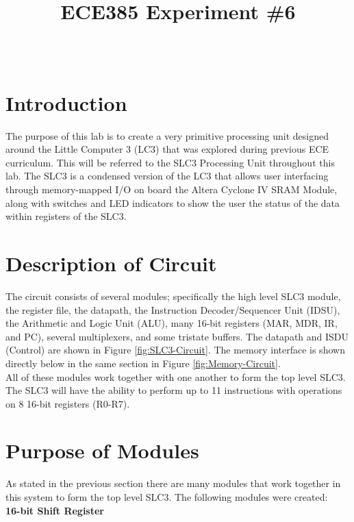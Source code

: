 \documentclass[journal, twocolumn, final,11pt,letterpaper]{IEEEtran}
\title{ECE385 Experiment \#6
	}
\author{
\IEEEauthorblockN{Eric Meyers, Ryan Helsdingen}\\
\IEEEauthorblockA{Section ABG; TAs: Ben Delay, Shuo Liu \\
March 9th, 2016 \\
emeyer7, helsdin2}}
\begin{document}
	
\maketitle
\singlespacing

\section{Introduction}
The purpose of this lab is to create a very primitive processing unit designed around the Little Computer 3 (LC3) that was explored during previous ECE curriculum. This will be referred to the SLC3 Processing Unit throughout this lab. The SLC3 is a condensed version of the LC3 that allows user interfacing through memory-mapped I/O on board the Altera Cyclone IV SRAM Module, along with switches and LED indicators to show the user the status of the data within registers of the SLC3.  

\section{Description of Circuit}
The circuit consists of several modules; specifically the high level SLC­3 module, the register file, the datapath, the Instruction Decoder/Sequencer Unit (IDSU), the Arithmetic and Logic Unit (ALU), many 16-bit registers (MAR, MDR, IR, and PC), several multiplexers, and some tristate buffers. The datapath and ISDU (Control) are shown in Figure \ref{fig:SLC3-Circuit}. The memory interface is shown directly below in the same section in Figure \ref{fig:Memory-Circuit}.\\

All of these modules work together with one another to form the top level SLC3. The SLC3 will have the ability to perform up to 11 instructions with operations on 8 16-bit registers (R0-R7). \\

\section{Purpose of Modules}
As stated in the previous section there are many modules that work together in this system to form the top level SLC3. The following modules were created:\\

\normalsize\textbf{16-bit Shift Register} \\
\end{document}
